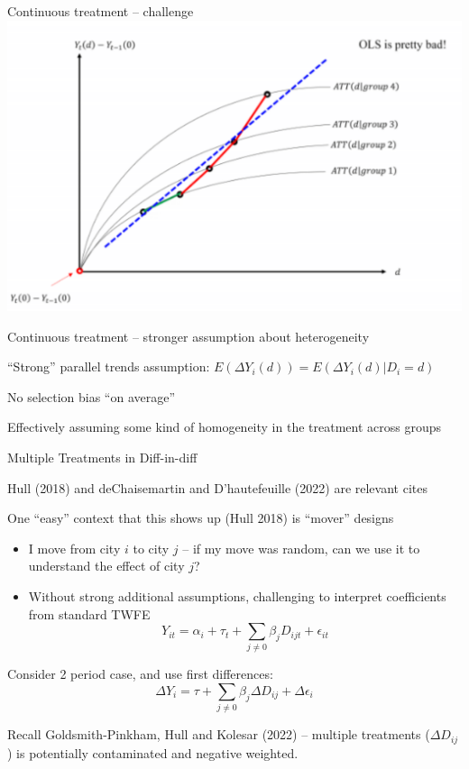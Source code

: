 \documentclass[notes,11pt, aspectratio=169]{beamer}
\newenvironment{wideitemize}{\itemize\addtolength{\itemsep}{10pt}}{\enditemize}
\begin{document}
\begin{frame}{Continuous treatment -- challenge}
  \includegraphics[width=0.8\linewidth]{images/continuous_did_2.pdf}
\end{frame}

\begin{frame}{Continuous treatment -- stronger assumption about heterogeneity}
  \begin{wideitemize}
  \item ``Strong'' parallel trends assumption: $E(\Delta Y_{i}(d)) = E(\Delta Y_{i}(d) | D_{i} = d)$
  \item No selection bias ``on average''
  \item Effectively assuming some kind of homogeneity in the treatment across groups
  \end{wideitemize}
\end{frame}

\begin{frame}{Multiple Treatments in Diff-in-diff}
  \begin{wideitemize}
  \item Hull (2018) and deChaisemartin and D'hautefeuille (2022) are relevant cites
  \item One ``easy'' context that this shows up (Hull 2018) is ``mover'' designs
    \begin{itemize}
    \item I move from city $i$ to city $j$ -- if my move was random,
      can we use it to understand the effect of city $j$?
    \item Without strong additional assumptions, challenging to
      interpret coefficients from standard TWFE
      \begin{equation}
        Y_{it} = \alpha_{i} + \tau_{t} + \sum_{j\not=0}\beta_{j}D_{ijt} + \epsilon_{it}
      \end{equation}
    \end{itemize}
  \item Consider 2 period case, and use first differences:
    \begin{equation}
      \Delta Y_{i} = \tau + \sum_{j\not=0}\beta_{j}\Delta D_{ij} + \Delta\epsilon_{i}          
    \end{equation}
  \item Recall Goldsmith-Pinkham, Hull and Kolesar (2022) -- multiple
    treatments ($\Delta D_{ij}$) is potentially contaminated and
    negative weighted.
  \end{wideitemize}
\end{frame}
\end{document}
